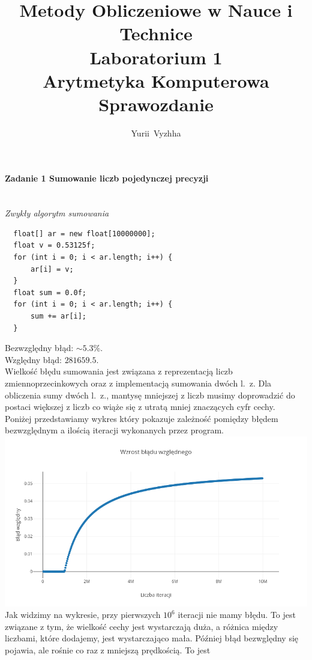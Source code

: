 \documentclass[12pt,a4paper]{article}
\author{Yurii~Vyzhha}
\title{Metody Obliczeniowe w Nauce i Technice \\ Laboratorium 1 \\
  Arytmetyka Komputerowa \\ Sprawozdanie}
\begin{document}
  \maketitle
  \paragraph{Zadanie 1 Sumowanie liczb pojedynczej precyzji}\mbox{}\vspace{3mm}\\
  \emph{Zwykły algorytm sumowania}
  \begin{Verbatim}
  float[] ar = new float[10000000];
  float v = 0.53125f;
  for (int i = 0; i < ar.length; i++) {
      ar[i] = v;
  }
  float sum = 0.0f;
  for (int i = 0; i < ar.length; i++) {
      sum += ar[i];
  }
  \end{Verbatim}
  Bezwzględny błąd: $ \sim 5.3 \%$. \\
  Względny błąd: $ 281659.5$. \\
  Wielkość błędu sumowania jest związana z reprezentacją liczb
  zmiennoprzecinkowych oraz z implementacją sumowania dwóch l.~z.
  Dla obliczenia sumy dwóch l.~z., mantysę mniejszej z liczb musimy doprowadzić
  do postaci większej z liczb co wiąże się z utratą mniej znaczących cyfr
  cechy. \\
  Poniżej przedstawiamy wykres który pokazuje zależność pomiędzy błędem
  bezwzględnym a ilością iteracji wykonanych przez program.\\
  \includegraphics[width=1\textwidth]{img/Plot1} \\
  Jak widzimy na wykresie, przy pierwszych $10^6$ iteracji nie mamy błędu.
  To jest związane z tym, że wielkość cechy jest wystarczają duża, a różnica
  między liczbami, które dodajemy, jest wystarczająco mała. Później błąd
  bezwględny się pojawia, ale rośnie co raz z mniejszą prędkością. To jest
\end{document}
